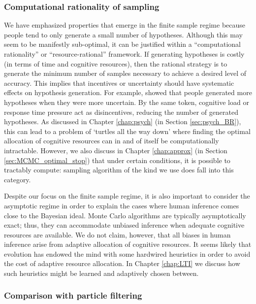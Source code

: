 \subsubsection{Computational rationality of sampling}

We have emphasized properties that emerge in the finite sample regime because people tend to only generate a small number of hypotheses. \citep{klein1999,ross96,Gettys1979,weber1993,dougherty1997} Although this may seem to be manifestly sub-optimal, it can be justified within a ``computational rationality'' or ``resource-rational'' framework.\citep{Vul2014,griffiths2015,Gershman2015,schulz2016simple} If generating hypotheses is costly (in terms of time and cognitive resources), then the rational strategy is to generate the minimum number of samples necessary to achieve a desired level of accuracy. This implies that incentives or uncertainty should have systematic effects on hypothesis generation. For example, \citet{hamrick2015think} showed that people generated more hypotheses when they were more uncertain. By the same token, cognitive load \citep{sprenger2011} or response time pressure \citep{Dougherty2003} act as disincentives, reducing the number of generated hypotheses. As discussed in Chapter \ref{chap:psych} (in Section \ref{sec:psych_BR}), this can lead to a problem of `turtles all the way down' where finding the optimal allocation of cognitive resources can in and of itself be computationally intractable. However, we also discuss in Chapter \ref{chap:approx} (in Section \ref{sec:MCMC_optimal_stop}) that under certain conditions, it is possible to tractably compute:  sampling algorithm of the kind we use does fall into this category.

Despite our focus on the finite sample regime, it is also important to consider the asymptotic regime in order to explain the cases where human inference comes close to the Bayesian ideal. Monte Carlo algorithms are typically asymptotically exact; thus, they can accommodate unbiased inference when adequate cognitive resources are available. We do not claim, however, that all biases in human inference arise from adaptive allocation of cognitive resources. It seems likely that evolution has endowed the mind with some hardwired heuristics in order to avoid the cost of adaptive resource allocation.\citep{gigerenzer09} In Chapter \ref{chap:LTI} we discuss how such heuristics might be learned and adaptively chosen between.

\subsubsection{Comparison with particle filtering}

